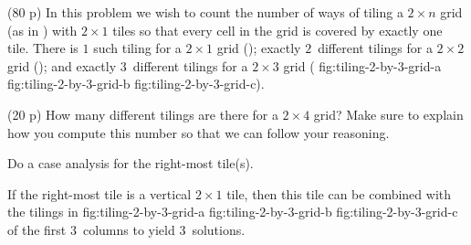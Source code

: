 \documentclass{jn-pset}
\begin{document}
\begin{problem}%
  \label{problem:grid-tilings}%
  (80 p)
  In this problem we wish to count the number of ways of tiling a
  $2 \times n$ grid
  (as in
  )  
  with
  $2 \times 1$ tiles
  so that every cell in the grid is covered by exactly one tile.
%         
%       
%       
%   
  There is
  $1$ such tiling for a $2 \times 1$ grid
  ();
  exactly $2$~different tilings for a $2 \times 2$ grid
  ();
  and
  exactly
  $3$~different tilings for a $2 \times 3$ grid
  (
  {fig:tiling-2-by-3-grid-a}
  {fig:tiling-2-by-3-grid-b}
  {fig:tiling-2-by-3-grid-c}).

  
  
  \begin{subproblem}
    \label{problem:tiling-subproblem}%
    {(20 p)}
    {\ignorespaces}
    How many different tilings are there for a $2 \times 4$ grid?
    Make sure to explain how you compute this number so that we can
    follow your reasoning.
  \end{subproblem}

\begin{solution}
  Do a case analysis for the  right-most tile(s).
  
  If the right-most tile is a vertical $2 \times 1$ tile,
  then this tile can be combined with the tilings in 
  {fig:tiling-2-by-3-grid-a}
  {fig:tiling-2-by-3-grid-b}
  {fig:tiling-2-by-3-grid-c}
  of the first $3$~columns
  to yield $3$~solutions.


\end{solution}
\end{problem}
\end{document}
